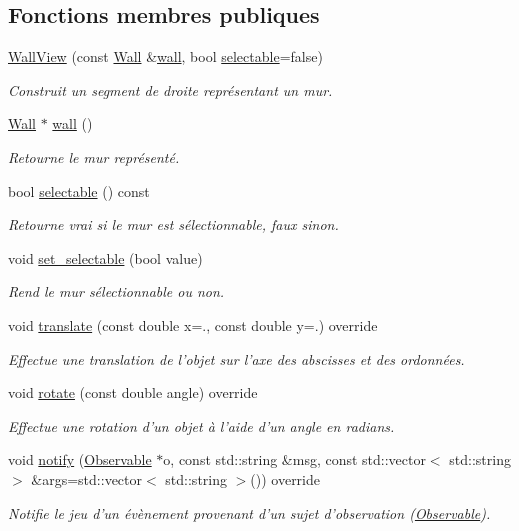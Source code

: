 \subsection*{Fonctions membres publiques}
\begin{DoxyCompactItemize}
\item 
\hyperlink{classWallView_acd55794debfd67a8f2b9088d3fb2e0dc}{Wall\+View} (const \hyperlink{classWall}{Wall} \&\hyperlink{classWallView_af93a05e8e527a55158707802c2f16911}{wall}, bool \hyperlink{classWallView_a674eb428edf9826a41616bc3f8618044}{selectable}=false)
\begin{DoxyCompactList}\small\item\em Construit un segment de droite représentant un mur. \end{DoxyCompactList}\item 
\hyperlink{classWall}{Wall} $\ast$ \hyperlink{classWallView_af93a05e8e527a55158707802c2f16911}{wall} ()
\begin{DoxyCompactList}\small\item\em Retourne le mur représenté. \end{DoxyCompactList}\item 
bool \hyperlink{classWallView_a674eb428edf9826a41616bc3f8618044}{selectable} () const 
\begin{DoxyCompactList}\small\item\em Retourne vrai si le mur est sélectionnable, faux sinon. \end{DoxyCompactList}\item 
void \hyperlink{classWallView_ab47e5401e6addcc68d84f702800cc282}{set\+\_\+selectable} (bool value)
\begin{DoxyCompactList}\small\item\em Rend le mur sélectionnable ou non. \end{DoxyCompactList}\item 
void \hyperlink{classWallView_addb0495d120d6dfccd37cc0d65f32660}{translate} (const double x=., const double y=.) override
\begin{DoxyCompactList}\small\item\em Effectue une translation de l’objet sur l’axe des abscisses et des ordonnées. \end{DoxyCompactList}\item 
void \hyperlink{classWallView_a418bfa06482ecd61cd07533de32be0f1}{rotate} (const double angle) override
\begin{DoxyCompactList}\small\item\em Effectue une rotation d’un objet à l’aide d’un angle en radians. \end{DoxyCompactList}\item 
void \hyperlink{classWallView_a68050e9027589cc7d1ab592e1cd8003c}{notify} (\hyperlink{classObservable}{Observable} $\ast$o, const std\+::string \&msg, const std\+::vector$<$ std\+::string $>$ \&args=std\+::vector$<$ std\+::string $>$()) override
\begin{DoxyCompactList}\small\item\em Notifie le jeu d'un évènement provenant d'un sujet d'observation (\hyperlink{classObservable}{Observable}). \end{DoxyCompactList}\end{DoxyCompactItemize}
